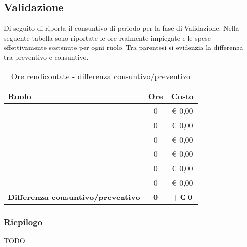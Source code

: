 		\subsection{Validazione} %
		\label{sub:consuntivo_validazione}
			Di seguito di riporta il consuntivo di periodo per la fase di Validazione. \newline
			Nella seguente tabella sono riportate le ore realmente impiegate e le spese effettivamente sostenute per ogni ruolo. Tra parentesi si evidenzia la differenza tra preventivo e consuntivo.
			\begin{table}[!h]
				\begin{center}
					\begin{tabularx}{0.90\textwidth}{|X|c|c|}
						\hline
						\textbf{Ruolo} & \textbf{Ore} & \textbf{Costo} \\
						\hline
						\roleProjectManager & 0 & \euro{} 0,00 \\
						\hline
						\roleAnalyst & 0 &  \euro{} 0,00 \\
						\hline
						\roleDesigner & 0 & \euro{} 0,00 \\
						\hline
						\roleAdministrator & 0  & \euro{} 0,00 \\
						\hline
						\roleProgrammer & 0 & \euro{} 0,00 \\
						\hline
						\roleVerifier & 0 & \euro{} 0,00 \\
						\hline
						\textbf{Differenza consuntivo/preventivo} & \textbf{0} & \textbf{+\euro{} 0} \\
						\hline
					\end{tabularx}
				\end{center}
			\caption{Ore rendicontate - differenza consuntivo/preventivo}
			\end{table}

			\subsubsection{Riepilogo} %
			TODO


